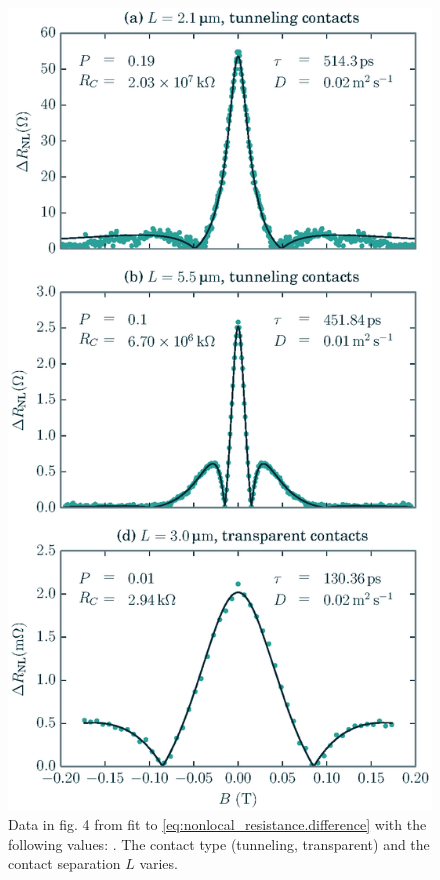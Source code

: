 \begin{figure}
  \caption{
    Data in fig. 4 from \cite{PhysRevLett.105.167202}
    fit to \cref{eq:nonlocal_resistance.difference}
    with the following values: \plotDifferenceInfo.
    The contact type (tunneling, transparent)
    and the contact separation $L$ varies.
  }
  \label{fig:nonlocal_resistance.difference}
  \includegraphics[width=\columnwidth]{figures/plot_difference}
\end{figure}

